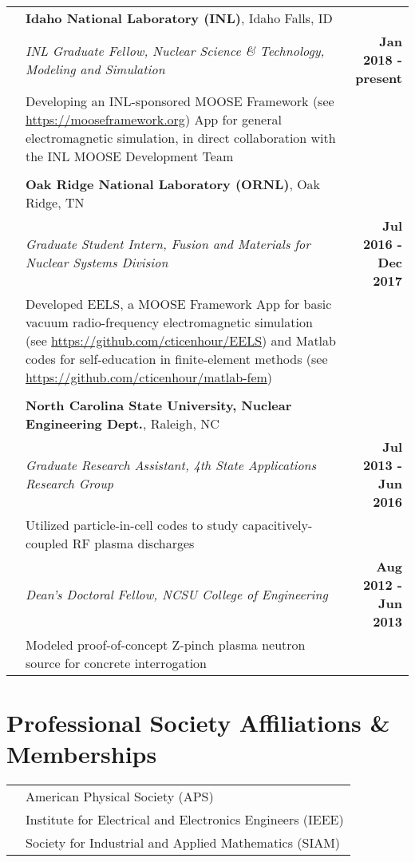 \documentclass{article}
\begin{document}
	\begin{tabularx}{\textwidth}{l X r}
		\hspace{2em} & \textbf{Idaho National Laboratory (INL)}, Idaho Falls, ID & \\
					 & \textit{INL Graduate Fellow, Nuclear Science \& Technology, Modeling and Simulation} & \textbf{Jan 2018 - present} \\
					 & Developing an INL-sponsored MOOSE Framework (see \url{https://mooseframework.org}) App for general electromagnetic simulation, in direct collaboration with the INL MOOSE Development Team & \\
					 & & \\
					 & \textbf{Oak Ridge National Laboratory (ORNL)}, Oak Ridge, TN & \\
					 & \textit{Graduate Student Intern, Fusion and Materials for Nuclear Systems Division} & \textbf{Jul 2016 - Dec 2017} \\
					 & Developed EELS, a MOOSE Framework App for basic vacuum radio-frequency electromagnetic simulation (see \url{https://github.com/cticenhour/EELS}) and Matlab codes for self-education in finite-element methods (see \url{https://github.com/cticenhour/matlab-fem})& \\					 
					 & & \\
					 & \textbf{North Carolina State University, Nuclear Engineering Dept.}, Raleigh, NC & \\
					 & \textit{Graduate Research Assistant, 4th State Applications Research Group} & \textbf{Jul 2013 - Jun 2016} \\
					 & \hspace{1em} Utilized particle-in-cell codes to study capacitively-coupled RF plasma discharges & \\
					 & \textit{Dean's Doctoral Fellow, NCSU College of Engineering} & \textbf{Aug 2012 - Jun 2013} \\
					 & \hspace{1em} Modeled proof-of-concept Z-pinch plasma neutron source for concrete interrogation & \\
	\end{tabularx}

\section*{Professional Society Affiliations \& Memberships}

\begin{tabularx}{\textwidth}{l l}
	\hspace{2em} & American Physical Society (APS) \\
				 & Institute for Electrical and Electronics Engineers (IEEE) \\
				 & Society for Industrial and Applied Mathematics (SIAM)
\end{tabularx}
\end{document}
